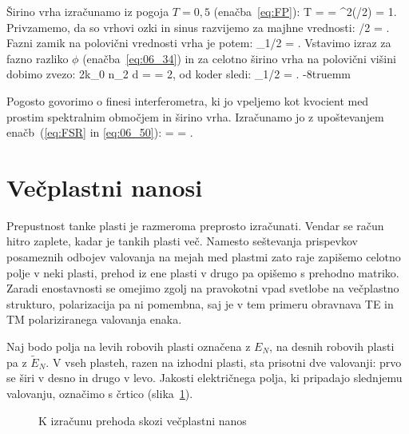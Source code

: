 Širino vrha izračunamo iz pogoja $T=0,5$ (enačba~\ref{eq:FP}):
\beq
T =  =  \qquad
\Longrightarrow \qquad {} \sin^2(\phi/2) = 1.
\label{eq:06_46}
\eeq
Privzamemo, da so vrhovi ozki in sinus razvijemo za majhne vrednosti:
\beq
\phi/2 = .
\label{eq:06_47}
\eeq
Fazni zamik na polovični vrednosti vrha je potem:
\beq
\phi_{1/2} = .
\label{eq:06_48}
\eeq
Vstavimo izraz za fazno razliko $\phi$ (enačba~\ref{eq:06_34}) in 
za celotno širino vrha na polovični višini dobimo zvezo:
\beq
2k_0 n_2 d =  = 2,
\label{eq:06_49}
\eeq
od koder sledi:
\beq
\delta \nu_{1/2} =  .
\label{eq:06_50}
\eeq
\vglue-8truemm
\begin{remark}
Pogosto govorimo o finesi interferometra, ki jo vpeljemo kot
kvocient med prostim spektralnim območjem in širino vrha. Izračunamo jo 
z upoštevanjem enačb~(\ref{eq:FSR} in \ref{eq:06_50}):
\beq
{} =   = .
\label{eq:06_51}
\eeq
\end{remark}

\section{Večplastni nanosi}
Prepustnost tanke plasti je razmeroma preprosto izračunati. Vendar se račun hitro
zaplete, kadar je tankih plasti več. Namesto seštevanja prispevkov 
posameznih odbojev valovanja na mejah med plastmi zato raje zapišemo celotno polje 
v neki plasti, prehod iz ene plasti v drugo pa opišemo s prehodno matriko.
Zaradi enostavnosti se omejimo zgolj na pravokotni 
vpad svetlobe na večplastno strukturo, polarizacija pa ni pomembna, saj 
je v tem primeru obravnava TE in TM polariziranega valovanja enaka.

Naj bodo polja na levih 
robovih plasti označena z $E_N$, na desnih robovih plasti pa z $\tilde{E}_N$. 
V vseh plasteh, razen na izhodni plasti, sta prisotni dve valovanji: prvo se širi
v desno in drugo v levo. Jakosti električnega polja, ki pripadajo slednjemu
valovanju, označimo s črtico (slika~\ref{fig:06_prehodneM}).
\begin{figure}[ht]
\centering
\def\svgwidth{100truemm} 

\caption{K izračunu prehoda skozi večplastni nanos}
\label{fig:06_prehodneM}
\end{figure}

